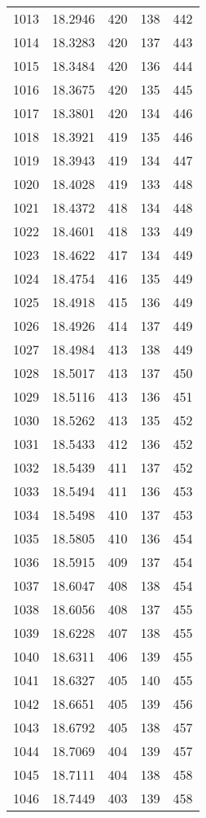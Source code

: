 \documentclass[12pt,a4paper]{article}
\begin{document}
\begin{tabular}{r|cccc}
	1013 & 18.2946 & 420 & 138 & 442 \\
	1014 & 18.3283 & 420 & 137 & 443 \\
	1015 & 18.3484 & 420 & 136 & 444 \\
	1016 & 18.3675 & 420 & 135 & 445 \\
	1017 & 18.3801 & 420 & 134 & 446 \\
	1018 & 18.3921 & 419 & 135 & 446 \\
	1019 & 18.3943 & 419 & 134 & 447 \\
	1020 & 18.4028 & 419 & 133 & 448 \\
	1021 & 18.4372 & 418 & 134 & 448 \\
	1022 & 18.4601 & 418 & 133 & 449 \\
	1023 & 18.4622 & 417 & 134 & 449 \\
	1024 & 18.4754 & 416 & 135 & 449 \\
	1025 & 18.4918 & 415 & 136 & 449 \\
	1026 & 18.4926 & 414 & 137 & 449 \\
	1027 & 18.4984 & 413 & 138 & 449 \\
	1028 & 18.5017 & 413 & 137 & 450 \\
	1029 & 18.5116 & 413 & 136 & 451 \\
	1030 & 18.5262 & 413 & 135 & 452 \\
	1031 & 18.5433 & 412 & 136 & 452 \\
	1032 & 18.5439 & 411 & 137 & 452 \\
	1033 & 18.5494 & 411 & 136 & 453 \\
	1034 & 18.5498 & 410 & 137 & 453 \\
	1035 & 18.5805 & 410 & 136 & 454 \\
	1036 & 18.5915 & 409 & 137 & 454 \\
	1037 & 18.6047 & 408 & 138 & 454 \\
	1038 & 18.6056 & 408 & 137 & 455 \\
	1039 & 18.6228 & 407 & 138 & 455 \\
	1040 & 18.6311 & 406 & 139 & 455 \\
	1041 & 18.6327 & 405 & 140 & 455 \\
	1042 & 18.6651 & 405 & 139 & 456 \\
	1043 & 18.6792 & 405 & 138 & 457 \\
	1044 & 18.7069 & 404 & 139 & 457 \\
	1045 & 18.7111 & 404 & 138 & 458 \\
	1046 & 18.7449 & 403 & 139 & 458 \\

\end{tabular}
\end{document}
